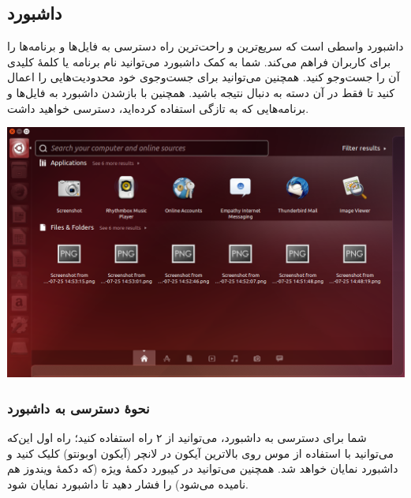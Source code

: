 \subsection{داشبورد}
داشبورد واسطی است که سریع‌ترین و راحت‌ترین راه دسترسی به فایل‌ها و برنامه‌ها را برای کاربران فراهم می‌کند. شما به کمک داشبورد می‌توانید نام برنامه یا کلمهٔ کلیدی آن را جست‌وجو کنید. همچنین می‌توانید برای جست‌وجوی خود محدودیت‌هایی را اعمال کنید تا فقط در آن دسته به دنبال نتیجه باشید. همچنین با بازشدن داشبورد به فایل‌ها و برنامه‌هایی که به تازگی استفاده کرده‌اید، دسترسی خواهید داشت.
\begin{center}
\includegraphics[scale=0.45]{pics/23.png}
\end{center}

\subsubsection{نحوهٔ دسترسی به داشبورد}
شما برای دسترسی به داشبورد، می‌توانید از ۲ راه استفاده کنید؛ راه اول این‌که می‌توانید با استفاده از موس روی بالاترین آیکون در لانچر (آیکون اوبونتو) کلیک کنید و داشبورد نمایان خواهد شد. همچنین می‌توانید در کیبورد دکمهٔ ویژه (که دکمهٔ ویندوز هم نامیده می‌شود) را فشار دهید تا داشبورد نمایان شود.

